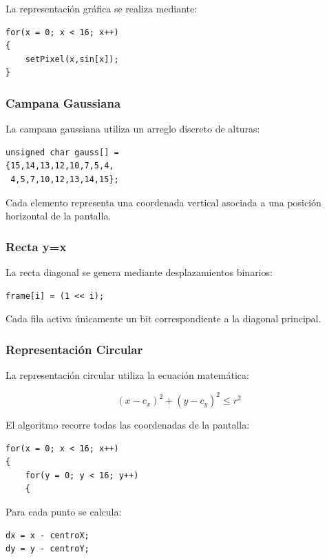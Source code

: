 La representación gráfica se realiza mediante:

\begin{verbatim}
for(x = 0; x < 16; x++)
{
    setPixel(x,sin[x]);
}
\end{verbatim}

\subsubsection{Campana Gaussiana}

La campana gaussiana utiliza un arreglo discreto de alturas:

\begin{verbatim}
unsigned char gauss[] =
{15,14,13,12,10,7,5,4,
 4,5,7,10,12,13,14,15};
\end{verbatim}

Cada elemento representa una coordenada vertical asociada a una posición horizontal de la pantalla.

\subsubsection{Recta y=x}

La recta diagonal se genera mediante desplazamientos binarios:

\begin{verbatim}
frame[i] = (1 << i);
\end{verbatim}

Cada fila activa únicamente un bit correspondiente a la diagonal principal.

\subsubsection{Representación Circular}

La representación circular utiliza la ecuación matemática:

\[
(x-c_x)^2 + (y-c_y)^2 \leq r^2
\]

El algoritmo recorre todas las coordenadas de la pantalla:

\begin{verbatim}
for(x = 0; x < 16; x++)
{
    for(y = 0; y < 16; y++)
    {
\end{verbatim}

Para cada punto se calcula:

\begin{verbatim}
dx = x - centroX;
dy = y - centroY;
\end{verbatim}

